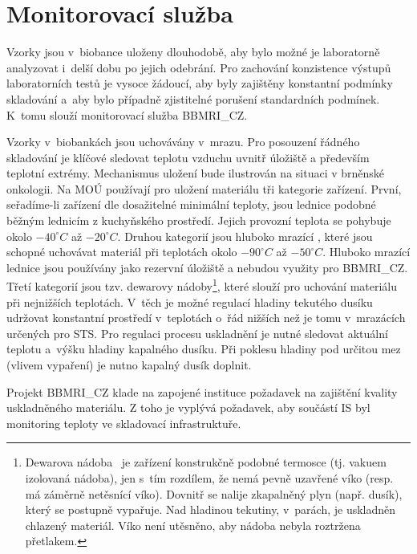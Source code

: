 \documentclass[11pt,draft,oneside]{fithesis2}
\newcommand{\ProjectName}{BBMRI\_CZ\xspace}
\begin{document}
\section{Monitorovací služba}\label{chapter:analysis:section:monitoring}
Vzorky jsou v~biobance uloženy dlouhodobě, aby bylo možné je laboratorně analyzovat i~delší dobu po jejich odebrání. Pro zachování konzistence výstupů laboratorních testů je vysoce žádoucí, aby byly zajištěny konstantní podmínky skladování a~aby bylo případně zjistitelné porušení standardních podmínek. K~tomu slouží monitorovací služba \ProjectName.

Vzorky v~biobankách jsou uchovávány v~mrazu. Pro posouzení řádného skladování je klíčové sledovat teplotu vzduchu uvnitř úložiště a především teplotní extrémy. Mechanismus uložení bude ilustrován na situaci v brněnské onkologii. Na MOÚ používají pro uložení materiálu tři kategorie zařízení. První, seřadíme-li zařízení dle dosažitelné minimální teploty, jsou lednice podobné běžným lednicím z kuchyňského prostředí. Jejich provozní teplota se pohybuje okolo $-40^{\circ}C$ až $-20^{\circ}C$. Druhou kategorií jsou hluboko mrazící , které jsou schopné uchovávat materiál při teplotách okolo $-90^{\circ}C$ až $-50^{\circ}C$. Hluboko mrazící lednice jsou používány jako rezervní úložiště a nebudou využity pro \ProjectName. Třetí kategorií jsou tzv. dewarovy nádoby\footnote{Dewarova nádoba~\cite{dewar} je zařízení konstrukčně podobné termosce (tj. vakuem izolovaná nádoba), jen s~tím rozdílem, že nemá pevně uzavřené víko (resp. má záměrně netěsnící víko). Dovnitř se nalije zkapalněný plyn (např. dusík), který se postupně vypařuje. Nad hladinou tekutiny, v~parách, je uskladněn chlazený materiál. Víko není utěsněno, aby nádoba nebyla roztržena přetlakem.}, které slouží pro uchování materiálu při nejnižších teplotách. V~těch je možné regulací hladiny tekutého dusíku udržovat konstantní prostředí v~teplotách o~řád nižších než je tomu v~mrazácích určených pro STS. Pro regulaci procesu uskladnění je nutné sledovat aktuální teplotu a~výšku hladiny kapalného dusíku. Při poklesu hladiny pod určitou mez (vlivem vypaření) je nutno kapalný dusík doplnit. 

Projekt \ProjectName klade na zapojené instituce požadavek na zajištění kvality uskladněného materiálu. Z toho je vyplývá požadavek, aby součástí IS byl monitoring teploty ve skladovací infrastruktuře.
\end{document}
